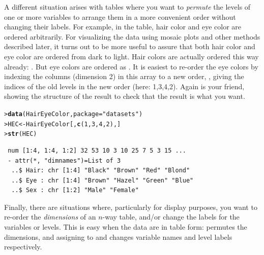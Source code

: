 \documentclass[10pt,krantz2]{krantz}\usepackage[]{graphicx}\usepackage[]{color}
\makeatletter
\newcommand{\hlnum}[1]{\textcolor[rgb]{0.686,0.059,0.569}{#1}}%
\newcommand{\hlstr}[1]{\textcolor[rgb]{0.192,0.494,0.8}{#1}}%
\newcommand{\hlstd}[1]{\textcolor[rgb]{0.345,0.345,0.345}{#1}}%
\newcommand{\hlkwb}[1]{\textcolor[rgb]{0.69,0.353,0.396}{#1}}%
\newcommand{\hlkwc}[1]{\textcolor[rgb]{0.333,0.667,0.333}{#1}}%
\newcommand{\hlkwd}[1]{\textcolor[rgb]{0.737,0.353,0.396}{\textbf{#1}}}%
\newenvironment{kframe}{%
 \def\at@end@of@kframe{}%
 \ifinner\ifhmode%
  \def\at@end@of@kframe{\end{minipage}}%
  \begin{minipage}{\columnwidth}%
 \fi\fi%
 \def\FrameCommand##1{\hskip\@totalleftmargin \hskip-\fboxsep
 \colorbox{shadecolor}{##1}\hskip-\fboxsep
     \hskip-\linewidth \hskip-\@totalleftmargin \hskip\columnwidth}%
 \MakeFramed {\advance\hsize-\width
   \@totalleftmargin\z@ \linewidth\hsize
   \@setminipage}}%
 {\par\unskip\endMakeFramed%
 \at@end@of@kframe}
\newenvironment{knitrout}{}{} %
\renewenvironment{knitrout}{\small\renewcommand{\baselinestretch}{.85}}{} %
\makeatother
\begin{document}
A different situation arises with tables where you want to \emph{permute} the levels
of one or more variables to arrange them in a more convenient order without changing
their labels. For example, in the  table, hair color and eye color are ordered arbitrarily.
For visualizing the data using mosaic plots and other methods described later, it
turns out to be more useful to assure that both hair color and eye color are
ordered from dark to light.
Hair colors are actually ordered this way already:
.
But eye colors are ordered as .
It is easiest to re-order the
eye colors by indexing the columns (dimension 2) in this array to a new order,
, giving the
indices of the old levels in the new order (here: 1,3,4,2).
Again  is your friend, showing the structure of the result
to check that the result is what you want.

\begin{knitrout}
\color{fgcolor}\begin{kframe}
\begin{alltt}
\hlstd{> }\hlkwd{data}\hlstd{(HairEyeColor,} \hlkwc{package} \hlstd{=} \hlstr{"datasets"}\hlstd{)}
\hlstd{> }\hlstd{HEC} \hlkwb{<-} \hlstd{HairEyeColor[,} \hlkwd{c}\hlstd{(}\hlnum{1}\hlstd{,} \hlnum{3}\hlstd{,} \hlnum{4}\hlstd{,} \hlnum{2}\hlstd{), ]}
\hlstd{> }\hlkwd{str}\hlstd{(HEC)}
\end{alltt}
\begin{verbatim}
 num [1:4, 1:4, 1:2] 32 53 10 3 10 25 7 5 3 15 ...
 - attr(*, "dimnames")=List of 3
  ..$ Hair: chr [1:4] "Black" "Brown" "Red" "Blond"
  ..$ Eye : chr [1:4] "Brown" "Hazel" "Green" "Blue"
  ..$ Sex : chr [1:2] "Male" "Female"
\end{verbatim}
\end{kframe}
\end{knitrout}

Finally, there are situations where, particularly for display purposes, you
want to re-order the \emph{dimensions} of an $n$-way table, and/or change the
labels for the variables or levels.
This is easy when the data are in table form:  permutes
the dimensions, and assigning to  and 
changes variable names and level labels respectively.
\end{document}

